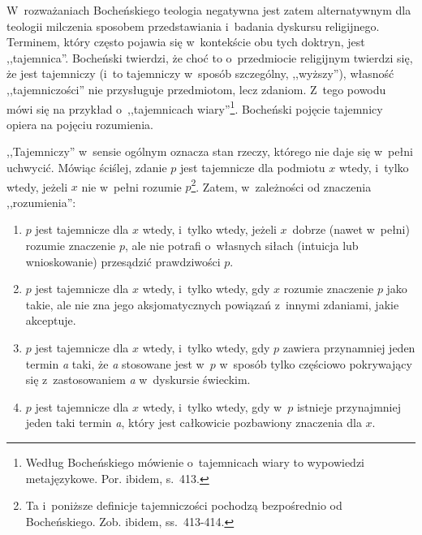 W~rozważaniach Bocheńskiego teologia negatywna jest zatem alternatywnym dla teologii milczenia sposobem przedstawiania i~badania dyskursu religijnego. Terminem, który często pojawia się w~kontekście obu tych doktryn, jest ,,tajemnica''. Bocheński twierdzi, że choć to o~przedmiocie religijnym twierdzi się, że jest tajemniczy (i~to tajemniczy w~sposób szczególny, ,,wyższy''), własność ,,tajemniczości'' nie przysługuje przedmiotom, lecz zdaniom. Z~tego powodu mówi się na przykład o~,,tajemnicach wiary''\footnote{Według Bocheńskiego mówienie o~tajemnicach wiary to wypowiedzi metajęzykowe. Por. ibidem, s.~413.}. Bocheński pojęcie tajemnicy opiera na pojęciu rozumienia.

\begin{defin}[Tajemnica]
,,Tajemniczy'' w~sensie ogólnym oznacza stan rzeczy, którego nie daje się w~pełni uchwycić. Mówiąc ściślej, zdanie $p$ jest tajemnicze dla podmiotu $x$ wtedy, i~tylko wtedy, jeżeli $x$ nie w~pełni rozumie $p$\footnote{Ta i~poniższe definicje tajemniczości pochodzą bezpośrednio od Bocheńskiego. Zob. ibidem, ss.~413-414.}. Zatem, w~zależności od znaczenia ,,rozumienia'':

\begin{enumerate}[label = (\arabic*)]
\item $p$ jest tajemnicze dla $x$ wtedy, i~tylko wtedy, jeżeli $x$~dobrze (nawet w~pełni) rozumie znaczenie $p$, ale nie potrafi o~własnych siłach (intuicja lub wnioskowanie) przesądzić prawdziwości $p$.
\item $p$ jest tajemnicze dla $x$ wtedy, i~tylko wtedy, gdy $x$ rozumie znaczenie $p$ jako takie, ale nie zna jego aksjomatycznych powiązań z~innymi zdaniami, jakie akceptuje.
\item $p$ jest tajemnicze dla $x$ wtedy, i~tylko wtedy, gdy $p$ zawiera przynamniej jeden termin \textit{a} taki, że \textit{a} stosowane jest w~$p$ w~sposób tylko częściowo pokrywający się z~zastosowaniem \textit{a} w~dyskursie świeckim.
\item $p$ jest tajemnicze dla $x$ wtedy, i~tylko wtedy, gdy w~$p$ istnieje przynajmniej jeden taki termin \textit{a}, który jest całkowicie pozbawiony znaczenia dla $x$.
\end{enumerate}
\end{defin}

